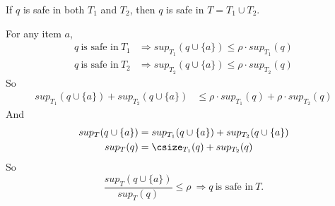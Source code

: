 %
%

\begin{lemma}%
\label{CorrectnessOfPartitioning}
  If $q$ is safe in both $T_1$ and $T_2$, then $q$ is safe in $T = T_1 \cup T_2$.
\end{lemma}
\begin{pf}
For any item $a$,
  \begin{align*}
   q~\text{is safe in}~T_1 &\Rightarrow sup_{T_1}(q\cup\{a\}) \le \rho\cdot sup_{T_1}(q) \\
   q~\text{is safe in}~T_2 &\Rightarrow sup_{T_2}(q\cup\{a\}) \le \rho\cdot sup_{T_2}(q)
  \end{align*}
  So \begin{align*}
   sup_{T_1}(q\cup\{a\}) + sup_{T_2}(q\cup\{a\}) &\le \rho\cdot sup_{T_1}(q) + \rho\cdot sup_{T_2}(q)
  \end{align*}
  And \begin{align*}
    sup_T(q\cup\{a\}) &= sup_{T_1}(q\cup\{a\}) + sup_{T_2}(q\cup\{a\}) \\
    sup_T(q) &= \csize_{T_1}(q) + sup_{T_2}(q)
  \end{align*}
  So $$ \frac{sup_T(q\cup\{a\})}{sup_T(q)} \le \rho~\Rightarrow q~\text{is safe in}~T .$$
\end{pf}

